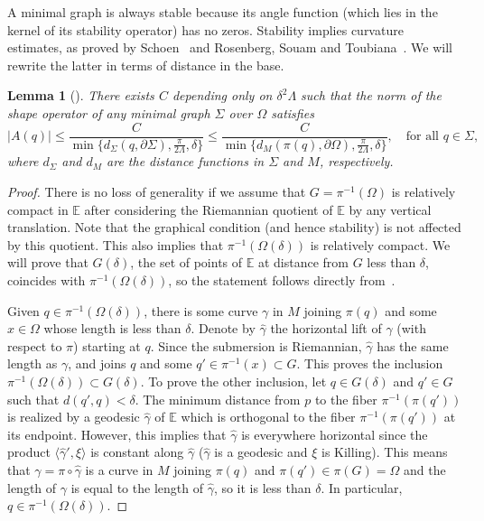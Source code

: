 \documentclass[a4paper,10pt,reqno]{amsart}
\newcommand{\E}{\mathbb{E}}
\newtheorem{lemma}[theorem]{Lemma}
\theoremstyle{definition}
\theoremstyle{remark}
\numberwithin{equation}{section}
\begin{document}
A minimal graph is always stable because its angle function (which lies in the kernel of its stability operator) has no zeros. Stability implies curvature estimates, as proved by Schoen~\cite[Thm.~3]{Schoen} and Rosenberg, Souam and Toubiana~\cite[Thm.~2.5]{RST}. We will rewrite the latter in terms of distance in the base.

\begin{lemma}[{\cite[Thm.~2.5]{RST}}]\label{lem:curvature-estimate}
There exists $C$ depending only on $\delta^2\Lambda$ such that the norm of the shape operator of any minimal graph $\Sigma$ over $\Omega$ satisfies
\[|A(q)|\leq\frac{C}{\min\{d_\Sigma(q,\partial\Sigma),\frac{\pi}{2\Lambda},\delta\}}\leq\frac{C}{\min\{d_M(\pi(q),\partial\Omega),\frac{\pi}{2\Lambda},\delta\}},\quad\text{for all }q\in\Sigma,\]
where $d_\Sigma$ and $d_M$ are the distance functions in $\Sigma$ and $M$, respectively.
\end{lemma}

\begin{proof}
There is no loss of generality if we assume that $G=\pi^{-1}(\Omega)$ is relatively compact in $\E$ after considering the Riemannian quotient of $\E$ by any vertical translation. Note that the graphical condition (and hence stability) is not affected by this quotient. This also implies that $\pi^{-1}(\Omega(\delta))$ is relatively compact. We will prove that $G(\delta)$, the set of points of $\E$ at distance from $G$ less than $\delta$, coincides with $\pi^{-1}(\Omega(\delta))$, so the statement follows directly from~\cite[Thm.~2.5]{RST}.

Given $q\in\pi^{-1}(\Omega(\delta))$, there is some curve $\gamma$ in $M$ joining $\pi(q)$ and some $x\in\Omega$ whose length is less than $\delta$. Denote by $\widehat\gamma$ the horizontal lift of $\gamma$ (with respect to $\pi$) starting at $q$. Since the submersion is Riemannian, $\widehat\gamma$ has the same length as $\gamma$, and joins $q$ and some $q'\in\pi^{-1}(x)\subset G$. This proves the inclusion $\pi^{-1}(\Omega(\delta))\subset G(\delta)$. To prove the other inclusion, let $q\in G(\delta)$ and $q'\in G$ such that $d(q',q)<\delta$. The minimum distance from $p$ to the fiber $\pi^{-1}(\pi(q'))$ is realized by a geodesic $\widehat\gamma$ of $\E$ which is orthogonal to the fiber $\pi^{-1}(\pi(q'))$ at its endpoint. However, this implies that $\widehat\gamma$ is everywhere horizontal since the product $\langle\widehat\gamma',\xi\rangle$ is constant along $\widehat\gamma$ ($\widehat\gamma$ is a geodesic and $\xi$ is Killing). This means that $\gamma=\pi\circ\widehat\gamma$ is a curve in $M$ joining $\pi(q)$ and $\pi(q')\in\pi(G)=\Omega$ and the length of $\gamma$ is equal to the length of $\widehat\gamma$, so it is less than $\delta$. In particular, $q\in\pi^{-1}(\Omega(\delta))$.
\end{proof}
	
\end{document}
